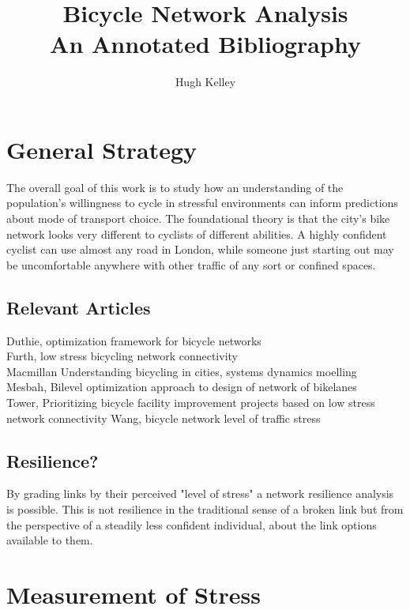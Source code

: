 \documentclass [12pt]{article}
\title{Bicycle Network Analysis\\\medskip An Annotated Bibliography}
\author{Hugh Kelley}
\begin{document}
\maketitle

\section{General Strategy}

The overall goal of this work is to study how an understanding of the population's willingness to cycle in stressful environments can inform predictions about mode of transport choice. The foundational theory is that the city's bike network looks very different to cyclists of different abilities. A highly confident cyclist can use almost any road in London, while someone just starting out may be uncomfortable anywhere with other traffic of any sort or confined spaces. 

\subsection{Relevant Articles}

Duthie, optimization framework for bicycle networks
\cite{Duthie14}\\
Furth, low stress bicycling network connectivity
\cite{Furth16}\\
Macmillan Understanding bicycling in cities, systems dynamics moelling
\cite{Macmillan17}\\
Mesbah, Bilevel optimization approach to design of network of bikelanes
\cite{Mesbah12}\\
Tower, Prioritizing bicycle facility improvement projects based on low stress network connectivity
\cite{Tower14}
Wang, bicycle network level of traffic stress
\cite{Wang16}


\subsection{Resilience?}

By grading links by their perceived "level of stress" a network resilience analysis is possible. This is not resilience in the traditional sense of a broken link but from the perspective of a steadily less confident individual, about the link options available to them. 

\section{Measurement of Stress}
\end{document}
